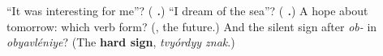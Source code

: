 \begin{tcolorbox}[breakable,colback=teal!4,colframe=teal!35!black,title={Before you move on}]
\textquotedblleft{}It was interesting for me\textquotedblright{}? (\emph{\textbf{  .}}) \textquotedblleft{}I dream of the sea\textquotedblright{}? (\emph{\textbf{   .}}) A hope about tomorrow: which verb form? (\emph{\textbf{}}, the future.) And the silent sign after \emph{ob-} in \emph{obyavléniye}? (The \textbf{hard sign}, \emph{tvyórdyy znak}.)
\end{tcolorbox}
